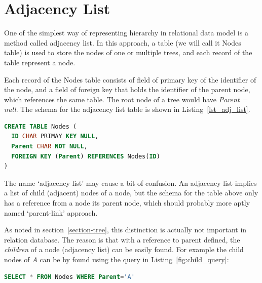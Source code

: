
\section{Adjacency List}\label{sec-adj-list}

One of the simplest way of representing hierarchy in relational data model is a method called adjacency list. In this approach, a table (we will call it Nodes table) is used to store the nodes of one or multiple trees, and each record of the table represent a node.

Each record of the Nodes table consists of field of primary key of the identifier of the node, and a field of foreign key that holds the identifier of the parent node, which references the same table. The root node of a tree would have {\em Parent = null}. The schema for the adjacency list table is shown in Listing~\ref{lst_adj_list}.

\begin{lstlisting}[language=sql,caption=Schema for adjacency list, label=lst_adj_list, float]
CREATE TABLE Nodes (
  ID CHAR PRIMAY KEY NULL,
  Parent CHAR NOT NULL,
  FOREIGN KEY (Parent) REFERENCES Nodes(ID)
)
\end{lstlisting}

\begin{remark}[Note:] %

The name `adjacency list' may cause a bit of confusion. An adjacency list implies a list of child (adjacent) nodes of a node, but the schema for the table above only has a reference from a node its parent node, which should probably more aptly named `parent-link' approach.

As noted in section~\ref{section-tree}, this distinction is actually not important in relation database. The reason is that with a reference to parent defined, the {\em children} of a node (adjacency list) can be easily found. For example the child nodes of $A$ can be by found using the query in Listing~\ref{fig:child_query}:

\begin{lstlisting}[language=sql,caption=SQL for querying child nodes., label=fig:child_query, float]
SELECT * FROM Nodes WHERE Parent='A'
\end{lstlisting}

\end{remark} %


